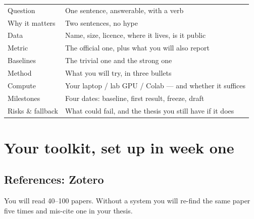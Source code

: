 \documentclass[11pt,a4paper]{article}
\begin{document}
\begin{center}
\small
\begin{tabularx}{0.95\textwidth}{L{3.4cm} X}
\toprule
{} &  \\
\midrule
{} Question & One sentence, answerable, with a verb \\
Why it matters & Two sentences, no hype \\
 Data & Name, size, licence, where it lives, is it public \\
Metric & The official one, plus what you will also report \\
 Baselines & The trivial one and the strong one \\
Method & What you will try, in three bullets \\
 Compute & Your laptop / lab GPU / Colab --- and whether it suffices \\
Milestones & Four dates: baseline, first result, freeze, draft \\
 Risks \& fallback & What could fail, and the thesis you still have if it does \\
\bottomrule
\end{tabularx}
\end{center}

\section{Your toolkit, set up in week one}
\label{sec:tools}

\subsection{References: Zotero}

You will read 40--100 papers. Without a system you will re-find the same paper
five times and mis-cite one in your thesis.
\end{document}
